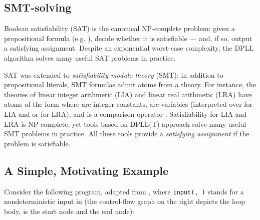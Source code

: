 
\subsection{SMT-solving}
Boolean satisfiability (SAT) is the canonical NP-complete problem: given a propositional formula (e.g. ), decide whether it is satisfiable --- and, if so, output a satisfying assignment.
Despite an exponential worst-case complexity, the DPLL algorithm \cite{Kroening_Strichman_08,Handbook_SAT} solves many useful SAT problems in practice.

SAT was extended to \emph{satisfiability modulo theory} (SMT): in addition to propositional literals, SMT formulas admit atoms from a theory.
For instance, the theories of linear integer arithmetic (LIA) and linear real arithmetic (LRA) have atoms of the form  where  are integer constants,  are variables (interpreted over  for LIA and  or  for LRA), and  is a comparison operator .
Satisfiability for LIA and LRA is NP-complete, yet tools based on DPLL(T) approach \cite{Kroening_Strichman_08,Handbook_SAT} solve many useful SMT problems in practice. All these tools provide a \emph{satisfying assignment} if the problem is satisfiable.


\subsection{A Simple, Motivating Example}
\label{subsec:rate_lim}
Consider the following program, adapted from \cite{Monniaux_Gonnord_SAS11}, where \lstinline|input(, )| stands for a nondeterministic input in  (the control-flow graph on the right depicts the loop body,  is the start node and  the end node):

